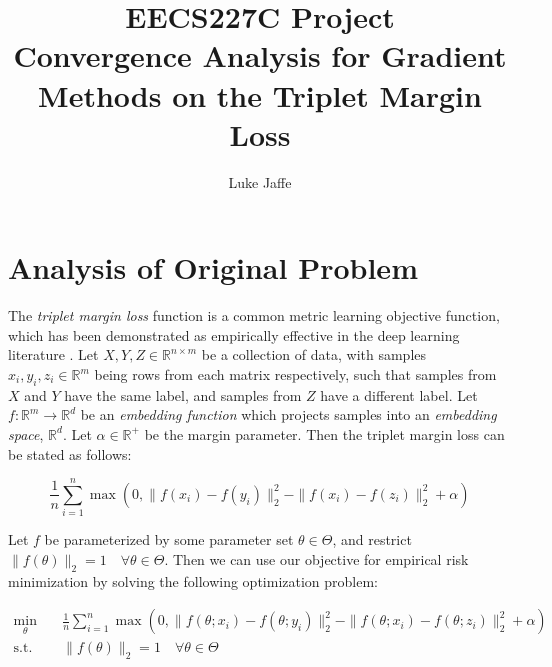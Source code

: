 \documentclass[11pt]{article}
\begin{document}
\author{Luke Jaffe}
\title{
    EECS227C Project \\
    \large Convergence Analysis for Gradient Methods on the Triplet Margin Loss
    }
\maketitle

\medskip

\section{Analysis of Original Problem}

The \textit{triplet margin loss} function is a common metric learning objective function, which has been demonstrated as empirically effective in the deep learning literature \cite{schroff_facenet_2015, hermans_defense_2017}. Let $X, Y, Z \in \mathbb{R}^{n \times m}$ be a collection of data, with samples $x_i, y_i, z_i \in \mathbb{R}^m$ being rows from each matrix respectively, such that samples from $X$ and $Y$ have the same label, and samples from $Z$ have a different label. Let $f: \mathbb{R}^m \rightarrow \mathbb{R}^d$ be an \textit{embedding function} which projects samples into an \textit{embedding space}, $\mathbb{R}^d$. Let $\alpha \in \mathbb{R}^+$ be the margin parameter. Then the triplet margin loss can be stated as follows:

\begin{equation}
    \frac{1}{n} \sum_{i=1}^{n} \max(0, \| f(x_i) - f(y_i)\|_2^2 - \| f(x_i) - f(z_i)\|_2^2 + \alpha)
\end{equation}

Let $f$ be parameterized by some parameter set $\theta \in \Theta$, and restrict $\| f(\theta)\|_2 = 1 \quad \forall \theta \in \Theta$. Then we can use our objective for empirical risk minimization by solving the following optimization problem:

\begin{equation}
\begin{aligned}
    \min_{\theta} \quad & \frac{1}{n} \sum_{i=1}^{n} \max(0, \| f(\theta; x_i) - f(\theta; y_i)\|_2^2 - \| f(\theta; x_i) - f(\theta; z_i)\|_2^2 + \alpha) \\
    \textrm{s.t.} \quad &  \| f(\theta)\|_2 = 1 \quad \forall \theta \in \Theta
\end{aligned}
\end{equation}
\end{document}
